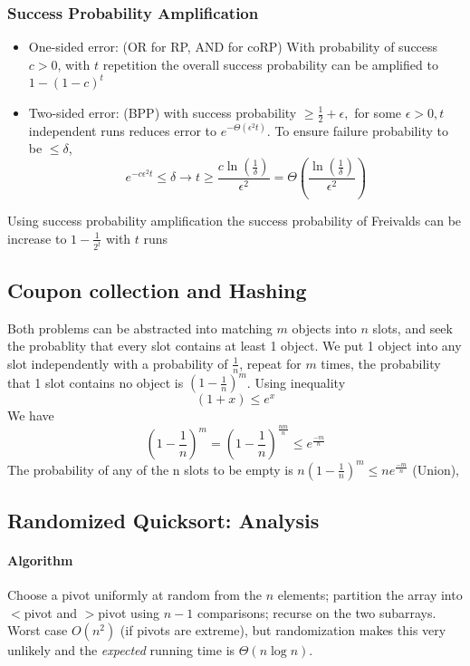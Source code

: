 \documentclass[9pt]{extarticle}
\begin{document}
\subsubsection{Success Probability Amplification}
\begin{itemize}
    \item One-sided error: (OR for RP, AND for coRP) With probability of success $c > 0$, with $t$ repetition the overall success probability can be amplified to $1 - (1-c)^t$
    \item Two-sided error: (BPP) with success probability $\geq \frac{1}{2} + \epsilon, $ for some $\epsilon > 0, t$ independent runs reduces error to $e^{-\Theta(\epsilon^2 t)}$. To ensure failure probability to be $\leq \delta$, 
    \[e^{-c\epsilon^2 t} \leq \delta \rightarrow t \geq \frac{c\ln(\frac{1}{\delta})}{\epsilon^2} = \Theta(\frac{\ln(\frac{1}{\delta})}{\epsilon^2})\] 
\end{itemize}
Using success probability amplification the success probability of Freivalds can be increase to $1 - \frac{1}{2^t}$ with $t$ runs

\subsection{Coupon collection and Hashing}
Both problems can be abstracted into matching $m$ objects into $n$ slots, and seek the probablity that every slot contains at least 1 object. 
We put 1 object into any slot independently with a probability of $\frac{1}{n}$, repeat for $m$ times, the probability that 1 slot contains no object is $(1 - \frac{1}{n})^m$. Using inequality
\[(1+x) \leq e^x\]
We have \[(1-\frac{1}{n})^m = (1-\frac{1}{n})^\frac{nm}{n} \leq e^{\frac{-m}{n}}\]
The probability of any of the n slots to be empty is $n(1-\frac{1}{n})^m \leq ne^{\frac{-m}{n}}$ (Union), 
\subsection{Randomized Quicksort: Analysis}
\paragraph{Algorithm}
Choose a pivot uniformly at random from the $n$ elements; partition the array into $<$pivot and $>$pivot using $n-1$ comparisons; recurse on the two subarrays. Worst case $O(n^2)$ (if pivots are extreme), but randomization makes this very unlikely and the \emph{expected} running time is $\Theta(n\log n)$.
\end{document}
